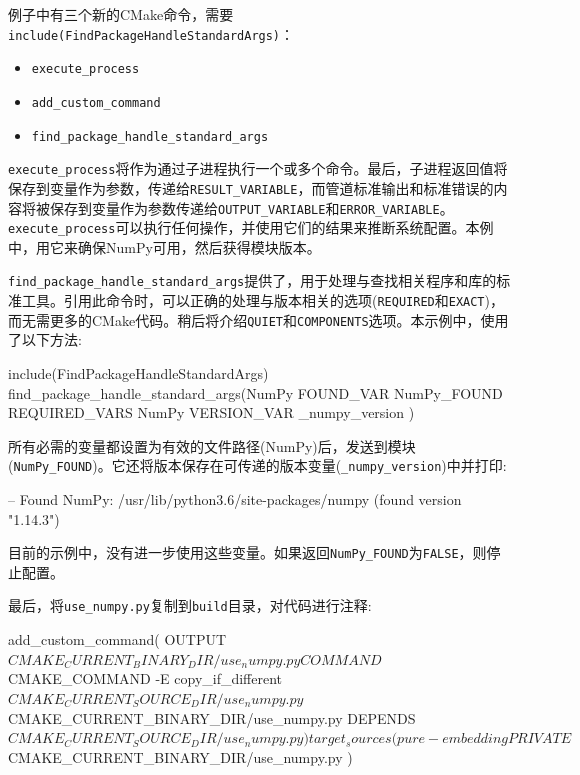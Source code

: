 
例子中有三个新的CMake命令，需要\texttt{include(FindPackageHandleStandardArgs)}：

\begin{itemize}
\item \texttt{execute\_process}

\item \texttt{add\_custom\_command}

\item \texttt{find\_package\_handle\_standard\_args}

\end{itemize}

\texttt{execute\_process}将作为通过子进程执行一个或多个命令。最后，子进程返回值将保存到变量作为参数，传递给\texttt{RESULT\_VARIABLE}，而管道标准输出和标准错误的内容将被保存到变量作为参数传递给\texttt{OUTPUT\_VARIABLE}和\texttt{ERROR\_VARIABLE}。\texttt{execute\_process}可以执行任何操作，并使用它们的结果来推断系统配置。本例中，用它来确保NumPy可用，然后获得模块版本。

\texttt{find\_package\_handle\_standard\_args}提供了，用于处理与查找相关程序和库的标准工具。引用此命令时，可以正确的处理与版本相关的选项(\texttt{REQUIRED}和\texttt{EXACT})，而无需更多的CMake代码。稍后将介绍\texttt{QUIET}和\texttt{COMPONENTS}选项。本示例中，使用了以下方法:

\begin{codebox}[cmake]
include(FindPackageHandleStandardArgs)
find_package_handle_standard_args(NumPy
  FOUND_VAR NumPy_FOUND
  REQUIRED_VARS NumPy
  VERSION_VAR _numpy_version
  )
\end{codebox}

所有必需的变量都设置为有效的文件路径(NumPy)后，发送到模块(\texttt{NumPy\_FOUND})。它还将版本保存在可传递的版本变量(\texttt{\_numpy\_version})中并打印:

\begin{codebox}[shell]
-- Found NumPy: /usr/lib/python3.6/site-packages/numpy (found version "1.14.3")
\end{codebox}

目前的示例中，没有进一步使用这些变量。如果返回\texttt{NumPy\_FOUND}为\texttt{FALSE}，则停止配置。

最后，将\texttt{use\_numpy.py}复制到\texttt{build}目录，对代码进行注释:

\begin{codebox}[cmake]
add_custom_command(
  OUTPUT
    ${CMAKE_CURRENT_BINARY_DIR}/use_numpy.py
  COMMAND
    ${CMAKE_COMMAND} -E copy_if_different ${CMAKE_CURRENT_SOURCE_DIR}/use_numpy.py
    ${CMAKE_CURRENT_BINARY_DIR}/use_numpy.py
  DEPENDS
    ${CMAKE_CURRENT_SOURCE_DIR}/use_numpy.py
  )
    
target_sources(pure-embedding
  PRIVATE
    ${CMAKE_CURRENT_BINARY_DIR}/use_numpy.py
  )
\end{codebox}

